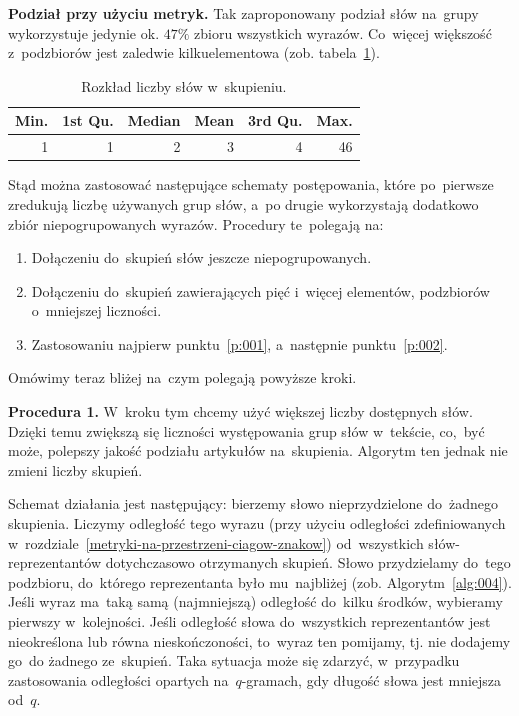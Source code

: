 \documentclass{praca1}
\begin{document}
\textbf{Podział przy użyciu metryk.}
Tak zaproponowany podział słów na~grupy wykorzystuje jedynie ok. $47\%$ zbioru wszystkich wyrazów. Co~więcej większość z~podzbiorów jest zaledwie kilkuelementowa (zob. tabela~\ref{tab:004}). 

\begin{table}[!h]
\centering
\caption{Rozkład liczby słów w~skupieniu.}
\begin{tabular}{|r|r|r|r|r|r|}
  \hline
Min. & 1st Qu. & Median & Mean & 3rd Qu. & Max. \\ 
  \hline
1 & 1 & 2 & 3 & 4 & 46 \\ 
   \hline
\end{tabular}
\label{tab:004}
\end{table}


Stąd można zastosować następujące schematy postępowania, które po~pierwsze zredukują liczbę używanych grup słów, a~po drugie wykorzystają dodatkowo zbiór niepogrupowanych wyrazów. Procedury te~polegają na:
\begin{enumerate}
\item\label{p:001} Dołączeniu do~skupień słów jeszcze niepogrupowanych.
\item\label{p:002} Dołączeniu do~skupień zawierających pięć i~więcej elementów, podzbiorów o~mniejszej liczności.
\item Zastosowaniu najpierw punktu~\ref{p:001}, a~następnie punktu~\ref{p:002}.
\end{enumerate}

Omówimy teraz bliżej na~czym polegają powyższe kroki.

\textbf{Procedura 1.} W~kroku tym chcemy użyć większej liczby dostępnych słów. Dzięki temu zwiększą się liczności występowania grup słów w~tekście, co,~być może, polepszy jakość podziału artykułów na~skupienia. Algorytm ten jednak nie zmieni liczby skupień. 

Schemat działania jest następujący: bierzemy słowo nieprzydzielone do~żadnego skupienia. Liczymy odległość tego wyrazu (przy użyciu odległości zdefiniowanych w~rozdziale~\ref{metryki-na-przestrzeni-ciagow-znakow}) od~wszystkich słów-reprezentantów dotychczasowo otrzymanych skupień. Słowo przydzielamy do~tego podzbioru, do~którego reprezentanta było mu~najbliżej (zob. Algorytm~\ref{alg:004}). Jeśli wyraz ma~taką samą (najmniejszą) odległość do~kilku środków, wybieramy pierwszy w~kolejności. Jeśli odległość słowa do~wszystkich reprezentantów jest nieokreślona lub równa nieskończoności, to~wyraz ten pomijamy, tj. nie dodajemy go~do żadnego ze~skupień. Taka sytuacja może się zdarzyć, w~przypadku zastosowania odległości opartych na~$q$-gramach, gdy długość słowa jest mniejsza od~$q$.
\end{document}
